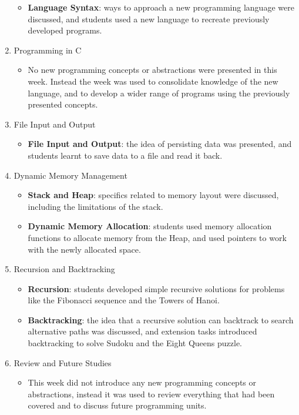 \begin{enumerate}
  \begin{itemize}[noitemsep,nolistsep]
  	\item \textbf{Language Syntax}: ways to approach a new programming language were discussed, and students used a new language to recreate previously developed programs.
  \end{itemize}
  \item Programming in C
  \begin{itemize}[noitemsep,nolistsep]
  	\item No new programming concepts or abstractions were presented in this week. Instead the week was used to consolidate knowledge of the new language, and to develop a wider range of programs using the previously presented concepts.
  \end{itemize}
  \item File Input and Output
  \begin{itemize}[noitemsep,nolistsep]
  	\item \textbf{File Input and Output}: the idea of persisting data was presented, and students learnt to save data to a file and read it back. 
  \end{itemize}

  \item Dynamic Memory Management
  \begin{itemize}[noitemsep,nolistsep]
  	\item \textbf{Stack and Heap}: specifics related to memory layout were discussed, including the limitations of the stack.
  	\item \textbf{Dynamic Memory Allocation}: students used memory allocation functions to allocate memory from the Heap, and used pointers to work with the newly allocated space.
  \end{itemize}

  \item Recursion and Backtracking
  \begin{itemize}[noitemsep,nolistsep]
  	\item \textbf{Recursion}: students developed simple recursive solutions for problems like the Fibonacci sequence and the Towers of Hanoi.
  	\item \textbf{Backtracking}: the idea that a recursive solution can backtrack to search alternative paths was discussed, and extension tasks introduced backtracking to solve Sudoku and the Eight Queens puzzle.
  \end{itemize}

  \item Review and Future Studies
  \begin{itemize}[noitemsep,nolistsep]
  	\item This week did not introduce any new programming concepts or abstractions, instead it was used to review everything that had been covered and to discuss future programming units.
  \end{itemize}
\end{enumerate}

